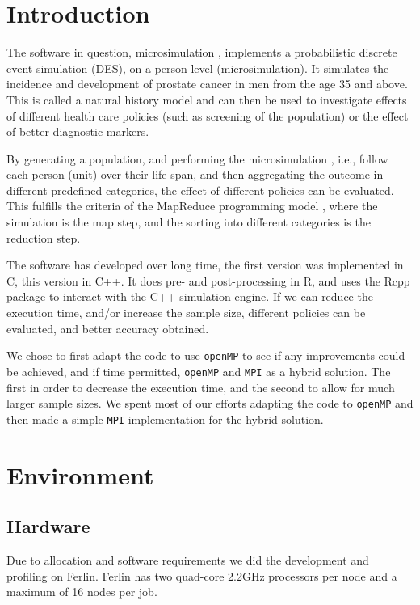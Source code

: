 \section{Introduction}

The software in question, microsimulation \cite{microsimulation},
implements a probabilistic discrete event simulation (DES), on a
person level (microsimulation). It simulates the incidence and development of prostate cancer
in men from the age 35 and above. This is called a natural history
model and can then be used to investigate effects of different health
care policies (such as screening of the population) or the effect of
better diagnostic markers.

By generating a population, and performing the microsimulation \citep{gulati_calibrating_2010},
i.e., follow each person (unit) over their life span, and then
aggregating the outcome in different predefined categories, the effect of
different policies can be evaluated. This fulfills the criteria of the
MapReduce programming model \cite{MapReduce:2004}, where the
simulation is the map step, and the sorting into different categories
is the reduction step.

The software has developed over long time, the first version was
implemented in C, this version in C++. It does pre- and post-processing
in R, and uses the Rcpp \citep{rcpp} package to interact with the C++
simulation engine. If we can reduce the execution time, and/or
increase the sample size, different policies can be evaluated, and
better accuracy obtained.

We chose to first adapt the code to use \texttt{openMP} to see if any
improvements could be achieved, and if time permitted, \texttt{openMP}
and \texttt{MPI} as a hybrid solution. The first in order to decrease
the execution time, and the second to allow for much larger sample
sizes. We spent most of our efforts adapting the code to
\texttt{openMP} and then made a simple \texttt{MPI} implementation for
the hybrid solution. 

\section{Environment}
\subsection{Hardware}
Due to allocation and software requirements we did the development and
profiling on Ferlin. Ferlin has two quad-core 2.2GHz processors per
node and a maximum of 16 nodes per job.

